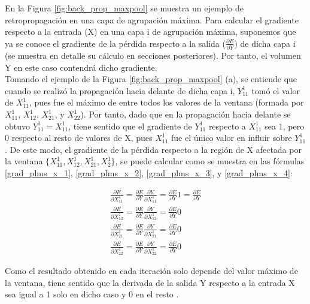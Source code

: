 En la Figura \ref{fig:back_prop_maxpool} se muestra un ejemplo de retropropagación en una capa de agrupación máxima. Para calcular el gradiente respecto a la entrada (X) en una capa i de agrupación máxima, suponemos que ya se conoce el gradiente de la pérdida respecto a la salida ($\frac{\partial E}{\partial Y}$) de dicha capa i (se muestra en detalle su cálculo en secciones posteriores). Por tanto, el volumen Y en este caso contendrá dicho gradiente. \\ 
Tomando el ejemplo de la Figura \ref{fig:back_prop_maxpool} (a), se entiende que cuando se realizó la propagación hacia delante de dicha capa i, $Y^1_{11}$ tomó el valor de $X^1_{11}$, pues fue el máximo de entre todos los valores de la ventana (formada por $X^1_{11}$, $X^1_{12}$, $X^1_{21}$, y $X^1_{22}$). Por tanto, dado que en la propagación hacia delante se obtuvo $Y^1_{11} = X^1_{11}$, tiene sentido que el gradiente de $Y^1_{11}$ respecto a $X^1_{11}$ sea 1, pero 0 respecto al resto de valores de X, pues $X^1_{11}$ fue el único valor en influir sobre $Y^1_{11}$. De este modo, el gradiente de la pérdida respecto a la región de X afectada por la ventana $\{X^1_{11}, X^1_{12}, X^1_{21}, X^1_{2} \}$, se puede calcular como se muestra en las fórmulas \ref{grad_plms_x_1}, \ref{grad_plms_x_2}, \ref{grad_plms_x_3}, y \ref{grad_plms_x_4}:

\begin{gather}
	\frac{\partial E}{\partial X^1_{11}} = \frac{\partial E}{\partial Y} \frac{\partial Y}{\partial X^1_{11}} = \frac{\partial E}{\partial Y} 1 = \frac{\partial E}{\partial Y} \label{grad_plms_x_1} \\
	\frac{\partial E}{\partial X^1_{12}} = \frac{\partial E}{\partial Y} \frac{\partial Y}{\partial X^1_{12}} = \frac{\partial E}{\partial Y} 0 \label{grad_plms_x_2} \\
	\frac{\partial E}{\partial X^1_{21}} = \frac{\partial E}{\partial Y} \frac{\partial Y}{\partial X^1_{21}} = \frac{\partial E}{\partial Y} 0 \label{grad_plms_x_3} \\
	\frac{\partial E}{\partial X^1_{22}} = \frac{\partial E}{\partial Y} \frac{\partial Y}{\partial X^1_{22}} = \frac{\partial E}{\partial Y} 0 \label{grad_plms_x_4}
\end{gather}


 
Como el resultado obtenido en cada iteración solo depende del valor máximo de la ventana, tiene sentido que la derivada de la salida Y respecto a la entrada X sea igual a 1 solo en dicho caso y 0 en el resto \cite{max_pool_backprop} \cite{max_pool_backprop_2}.
